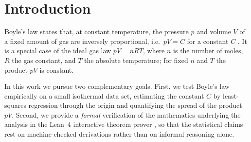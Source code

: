 \documentclass{article}
\theoremstyle{plain}
\theoremstyle{definition}
\theoremstyle{remark}
\begin{document}

\printAffiliationsAndNotice{}

\begin{abstract}
  We verify Boyle's law---that the product of pressure and volume of a gas is
  constant under isothermal conditions---against a set of $12$ laboratory
  measurements at $T = 293.15$~K. After removing a single transcription
  outlier, the product $pV$ is $249.3 \pm 2.6$~kPa$\cdot$L (relative spread
  $1.06\%$), and a least-squares fit of the inverse relation $p = C/V$ yields
  $C = 248.9$~kPa$\cdot$L with $R^2 = 0.9993$. We complement the empirical
  analysis with a machine-checked formalization in the Lean~4 theorem prover:
  we prove the derivative of the least-squares objective, the normal equation
  for regression through the origin, the convexity of the objective, and the
  inverse-proportionality statement of Boyle's law. The results confirm the
  law within experimental uncertainty and demonstrate a reproducible
  experiment--verification--report pipeline.
\end{abstract}

\section{Introduction}

Boyle's law states that, at constant temperature, the pressure $p$ and volume
$V$ of a fixed amount of gas are inversely proportional, i.e.\ $pV = C$ for a
constant $C$ \cite{west1999}. It is a special case of the ideal gas law
$pV = nRT$, where $n$ is the number of moles, $R$ the gas constant, and $T$ the
absolute temperature; for fixed $n$ and $T$ the product $pV$ is constant.

In this work we pursue two complementary goals. First, we test Boyle's law
empirically on a small isothermal data set, estimating the constant $C$ by
least-squares regression through the origin and quantifying the spread of the
product $pV$. Second, we provide a \emph{formal} verification of the
mathematics underlying the analysis in the Lean~4 interactive theorem prover
\cite{lean2021}, so that the statistical claims rest on machine-checked
derivations rather than on informal reasoning alone.
\end{document}
